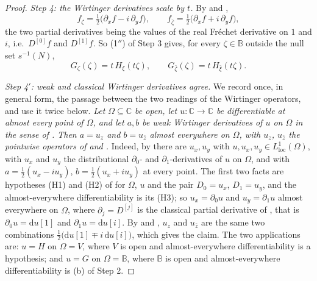 \begin{proof}
\emph{Step 4: the Wirtinger derivatives scale by $t$.}  By  and
,
\[
  f_\zeta=\tfrac12\bigl(\partial_xf-i\,\partial_yf\bigr),\qquad
  f_{\bar\zeta}=\tfrac12\bigl(\partial_xf+i\,\partial_yf\bigr),
\]
the two partial derivatives being the values of the real Fréchet derivative on
$1$ and $i$, i.e.\ $D^{[0]}f$ and $D^{[1]}f$.  So (1$''$) of Step 3 gives, for
every $\zeta\in\mathbb{B}$ outside the null set $s^{-1}(N)$,
\begin{equation}\tag{2}
  G_\zeta(\zeta)=t\,H_\xi(t\zeta),\qquad
  G_{\bar\zeta}(\zeta)=t\,H_{\bar\xi}(t\zeta).
\end{equation}

\emph{Step 4$'$: weak and classical Wirtinger derivatives agree.}  We record
once, in general form, the passage between the two readings of the Wirtinger
operators, and use it twice below.  \emph{Let $\Omega\subseteq\mathbb{C}$ be
open, let $u\colon\mathbb{C}\to\mathbb{C}$ be differentiable at almost every
point of $\Omega$, and let $a,b$ be weak Wirtinger derivatives of $u$ on
$\Omega$ in the sense of .  Then $a=u_z$ and
$b=u_{\bar z}$ almost everywhere on $\Omega$, with $u_z$, $u_{\bar z}$ the
pointwise operators of  and .}  Indeed, by
 there are $u_x,u_y$ with
$u,u_x,u_y\in L^1_{\mathrm{loc}}(\Omega)$, with $u_x$ and $u_y$ the
distributional $\partial_0$- and $\partial_1$-derivatives of $u$ on $\Omega$,
and with $a=\tfrac12(u_x-iu_y)$, $b=\tfrac12(u_x+iu_y)$ at every point.  The
first two facts are hypotheses (H1) and (H2) of
 for $\Omega$, $u$ and the pair $D_0=u_x$,
$D_1=u_y$, and the almost-everywhere differentiability is its (H3); so
$u_x=\partial_0u$ and $u_y=\partial_1u$ almost everywhere on $\Omega$, where
$\partial_j=D^{[j]}$ is the classical partial derivative of
, that is $\partial_0u=\mathrm{d}u[1]$ and
$\partial_1u=\mathrm{d}u[i]$.  By  and , $u_z$ and
$u_{\bar z}$ are the same two combinations
$\tfrac12\bigl(\mathrm{d}u[1]\mp i\,\mathrm{d}u[i]\bigr)$, which gives the
claim.  The two applications are: $u=H$ on $\Omega=V$, where $V$ is open and
almost-everywhere differentiability is a hypothesis; and $u=G$ on
$\Omega=\mathbb{B}$, where $\mathbb{B}$ is open and almost-everywhere
differentiability is (b) of Step 2.


\end{proof}
